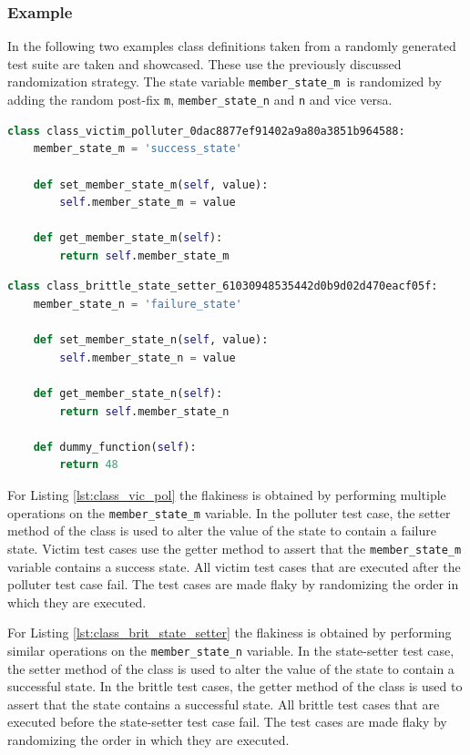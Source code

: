 \documentclass[
fancyheadings, %
%
%
]{stsreprt}
\begin{document}
\subsubsection{Example}
In the following two examples class definitions taken from a randomly generated test suite are taken and showcased. 
These use the previously discussed randomization strategy. 
The state variable \texttt{member\_state\_m }is randomized by adding the random post-fix \texttt{m}, \texttt{member\_state\_n} and \texttt{n} and vice versa. 
\begin{lstlisting}[language=Python, caption={Class definition used in a flaky test from the victim- and polluter-pattern}, label=lst:class_vic_pol]
class class_victim_polluter_0dac8877ef91402a9a80a3851b964588:
    member_state_m = 'success_state'

    def set_member_state_m(self, value):
        self.member_state_m = value

    def get_member_state_m(self):
        return self.member_state_m
\end{lstlisting}

\begin{lstlisting}[language=Python, caption={Class definition used in a flaky test from the brittle- and state-setter-pattern}, label=lst:class_brit_state_setter]
class class_brittle_state_setter_61030948535442d0b9d02d470eacf05f:
    member_state_n = 'failure_state'

    def set_member_state_n(self, value):
        self.member_state_n = value

    def get_member_state_n(self):
        return self.member_state_n

    def dummy_function(self):
        return 48
\end{lstlisting}
For Listing \ref{lst:class_vic_pol} the flakiness is obtained by performing multiple operations on the \newline \texttt{member\_state\_m} variable. 
In the polluter test case, the setter method of the class is used to alter the value of the state to contain a failure state.
Victim test cases use the getter method to assert that the \texttt{member\_state\_m} variable contains a success state. 
All victim test cases that are executed after the polluter test case fail.
The test cases are made flaky by randomizing the order in which they are executed. \par

For Listing \ref{lst:class_brit_state_setter} the flakiness is obtained by performing similar operations on the \texttt{member\_state\_n} variable. 
In the state-setter test case, the setter method of the class is used to alter the value of the state to contain a successful state. 
In the brittle test cases, the getter method of the class is used to assert that the state contains a successful state. 
All brittle test cases that are executed before the state-setter test case fail. 
The test cases are made flaky by randomizing the order in which they are executed.
\end{document}
